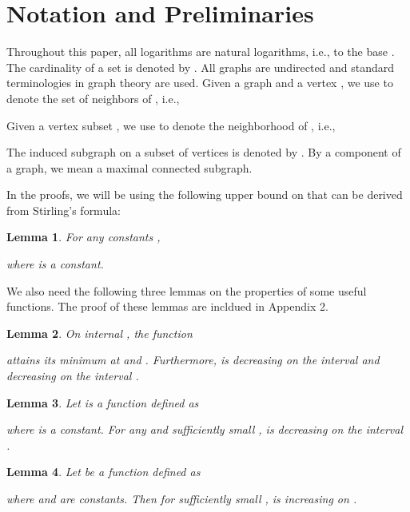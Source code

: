 \documentclass[11pt]{article}
\newtheorem{lemma}{Lemma}[section]
\begin{document}
 
\section{Notation and Preliminaries}

Throughout this paper, all logarithms are natural logarithms, i.e., 
to the base . The cardinality of a set  is denoted by .   
All graphs are undirected and standard 
terminologies in graph theory \cite{west01} are used.  Given a graph  and a vertex
, we use  to denote the set of neighbors of , i.e.,

Given a vertex subset , we use  to denote the neighborhood of , i.e.,
  
The induced subgraph on a subset of vertices  is denoted by .
By a component of a graph, we mean a maximal connected subgraph.  

In the proofs, we will be using the following upper bound on  that 
can be derived from Stirling's formula:
\begin{lemma}
\label{lem-stirling}
For any constants , 
 
where  is a constant.
\end{lemma}

We also need the  following three lemmas on the properties of some useful functions.  
The proof of these lemmas are incldued in Appendix 2.

\begin{lemma}
\label{lem-function-0}
On internal , the function 
  
attains its minimum at   and .  Furthermore,  is decreasing on the interval  and decreasing on the 
interval .
\end{lemma}

\begin{lemma}
\label{lem-function-1}
Let  is a function defined as

where  is a constant. For any  and sufficiently small ,  
 is decreasing on the interval .
\end{lemma}

\begin{lemma}
\label{lem-function-2}
Let  be a function defined as

where  and  are constants. Then for sufficiently small ,
 is increasing on .
\end{lemma}
\end{document}

